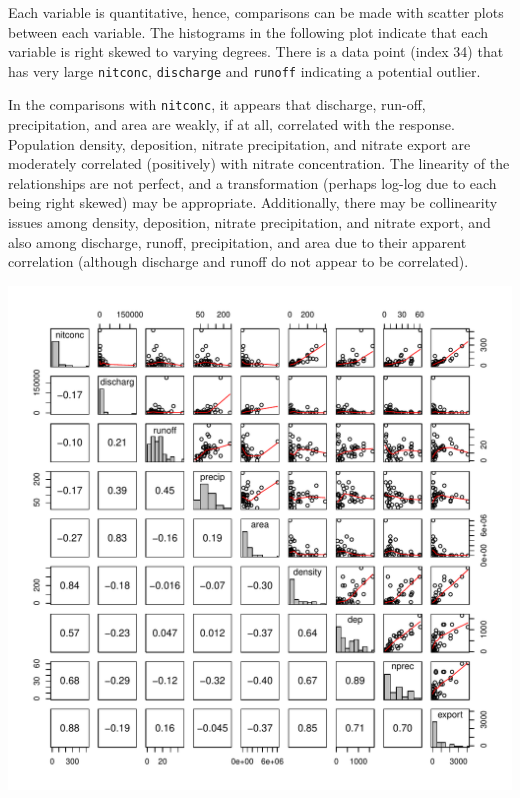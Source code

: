 \documentclass{homework}
\begin{document}
\begin{longproblem}
  \begin{solution}
  Each variable is quantitative, hence, comparisons can be made with scatter
  plots between each variable.  The histograms in the following plot indicate
  that each variable is right skewed to varying degrees.  There is a data point 
  (index 34) that has very large \texttt{nitconc}, \texttt{discharge} and
  \texttt{runoff} indicating a potential outlier. 

  In the comparisons with \texttt{nitconc}, it appears that discharge, run-off,
  precipitation, and area are weakly, if at all, correlated with the response.
  Population density, deposition, nitrate precipitation, and nitrate export
  are moderately correlated (positively) with nitrate concentration.  The
  linearity of the relationships are not perfect, and a transformation (perhaps
  log-log due to each being right skewed) may be appropriate.  Additionally,
  there may be collinearity issues among density, deposition, nitrate
  precipitation, and nitrate export, and also among discharge, runoff,
  precipitation, and area due to their apparent correlation (although discharge
  and runoff do not appear to be correlated). 

  \includegraphics[width=.9\textwidth]{eda_problem1.pdf}
  \end{solution}


\end{longproblem}
\end{document}
